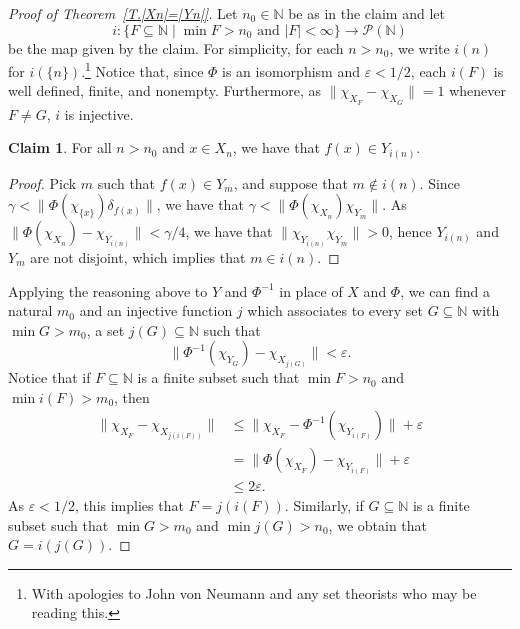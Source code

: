 \documentclass[11pt]{amsart}
\newcommand{\N}{\mathbb{N}}
\newcommand{\eps}{\varepsilon}
\newcommand{\cP}{\mathcal{P}}
\newcommand{\bbN}{\mathbb{N}}
\numberwithin{equation}{section}
\theoremstyle{definition}
\newtheorem{claim}[theorem]{Claim}
\theoremstyle{remark}
\numberwithin{equation}{section}
\begin{document}
\begin{proof}[Proof of Theorem~\ref{T.|Xn|=|Yn|}]
Let $n_0\in \N$ be as in the claim and let \[i\colon \{F\subseteq \N\mid \min F>n_0 \text{ and }|F|<\infty\}\to \cP(\N)\] be the map given by the claim.  For simplicity, for each $n> n_0$, we write $i(n)$ for $i(\{n\})$.\footnote{With apologies to John von Neumann and any set theorists who may be reading this.}  Notice that, since $\Phi$ is an isomorphism and $\eps<1/2$, each $i(F)$  is well defined, finite, and nonempty.  Furthermore, as $\|\chi_{X_F}-\chi_{X_G}\|=1$ whenever $F\neq G$, $i$ is injective.

\begin{claim}
For all $n>n_0$ and $x\in X_n$, we have that $f(x)\in Y_{i(n)}$.
\end{claim}

\begin{proof}
Pick $m$ such that $f(x)\in Y_m$, and suppose that $m\notin i(n)$. Since $\gamma<\|\Phi(\chi_{\{x\}})\delta_{f(x)}\|$, we have that $\gamma<\|\Phi(\chi_{X_n})\chi_{Y_m}\|$. As $\|\Phi(\chi_{X_n})-\chi_{Y_{i(n)}}\|<\gamma/4$, we have that $\|\chi_{Y_{i(n)}}\chi_{Y_m}\|>0$, hence $Y_{i(n)}$ and $Y_{m}$ are not disjoint, which implies that $m\in i(n)$.
\end{proof}
Applying the  reasoning above to $Y$ and $\Phi^{-1}$ in place of $X$ and $\Phi$, we can find a natural $m_0$ and an injective function $j$ which associates to every set $G\subseteq\bbN$ with $\min G>m_0$, a set $j(G)\subseteq\bbN$ such that 
\[
\|\Phi^{-1}(\chi_{Y_G}) -\chi_{X_{j(G)}}\|<\varepsilon.
\]
Notice that if $F\subseteq\bbN$ is a finite subset such that $\min F>n_0$ and $\min i(F)>m_0$, then
\begin{align*}
\|\chi_{X_F}-\chi_{X_{j(i(F))}}\|&\leq \|\chi_{X_F}-\Phi^{-1}(\chi_{Y_{i(F)}})\|+\eps\\&=\|\Phi(\chi_{X_F})-\chi_{Y_{i(F)}}\|+\eps\\
&\leq 2\eps.
\end{align*}
As $\eps<1/2$, this  implies that $F=j(i(F))$.  Similarly, if  $G\subseteq\bbN$   is a finite subset such that $\min G>m_0$ and  $\min j(G)>n_0$, we obtain that  $G=i(j(G))$.





\end{proof}
\end{document}
